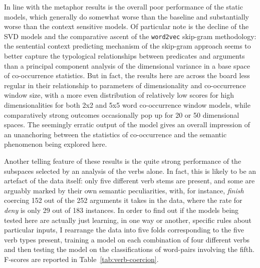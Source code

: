 In line with the metaphor results is the overall poor performance of the static models, which generally do somewhat worse than the baseline and substantially worse than the context sensitive models.  Of particular note is the decline of the \textsc{SVD} models and the comparative ascent of the \texttt{word2vec} skip-gram methodology: the sentential context predicting mechanism of the skip-gram approach seems to better capture the typological relationships between predicates and arguments than a principal component analysis of the dimensional variance in a base space of co-occurrence statistics.  But in fact, the results here are across the board less regular in their relationship to parameters of dimensionality and co-occurrence window size, with a more even distribution of relatively low scores for high dimensionalities for both 2x2 and 5x5 word co-occurrence window models, while comparatively strong outcomes occasionally pop up for 20 or 50 dimensional spaces.  The seemingly erratic output of the model gives an overall impression of an unanchoring between the statistics of co-occurrence and the semantic phenomenon being explored here.    

Another telling feature of these results is the quite strong performance of the subspaces selected by an analysis of the verbs alone.  In fact, this is likely to be an artefact of the data itself: only five different verb stems are present, and some are arguably marked by their own semantic peculiarities, with, for instance, \emph{finish} coercing 152 out of the 252 arguments it takes in the data, where the rate for \emph{deny} is only 29 out of 183 instances.  In order to find out if the models being tested here are actually just learning, in one way or another, specific rules about particular inputs, I rearrange the data into five folds corresponding to the five verb types present, training a model on each combination of four different verbs and then testing the model on the classifications of word-pairs involving the fifth.  F-scores are reported in Table~\ref{tab:verb-coercion}.

